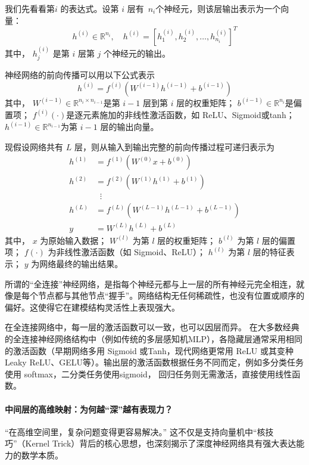 我们先看看第\( i \) 的表达式。设第 \( i \)  层有~$ n_i$个神经元，则该层输出表示为一个向量：
  \[
h^{(i)} \in \mathbb{R}^{n_i}, \quad h^{(i)} = \left[h^{(i)}_1, h^{(i)}_2, \dots, h^{(i)}_{n_i} \right]^T
\]
其中，  \( h^{(i)}_j \) 是第 \( i \) 层第 \( j \) 个神经元的输出。

神经网络的前向传播可以用以下公式表示
\[
h^{(i)} = f^{(i)}\left( W^{(i-1)} h^{(i-1)} + b^{(i-1)} \right)
\]
其中，
\( W^{(i-1)} \in \mathbb{R}^{n_i \times n_{i-1}} \)是第 \( i-1 \) 层到第 \( i \) 层的权重矩阵；
 \( b^{(i-1)} \in \mathbb{R}^{n_i} \)是偏置项；
 \( f^{(i)}(\cdot) \)是逐元素施加的非线性激活函数，如 ReLU、Sigmoid或tanh；
 \( h^{(i-1)} \in \mathbb{R}^{n_{i-1}} \)为第 \( i-1 \) 层的输出向量。
 
现假设网络共有 \( L \) 层，则从输入到输出完整的前向传播过程可递归表示为
\[
\begin{aligned}
h^{(1)} &= f^{(1)} \left(W^{(0)}x + b^{(0)}\right)\\[6pt]
h^{(2)} &= f^{(2)} \left(W^{(1)}h^{(1)} + b^{(1)}\right)\\[6pt]
&\;\;\vdots\\[6pt]
h^{(L)} &= f^{(L)} \left(W^{(L-1)}h^{(L-1)} + b^{(L-1)}\right)\\[6pt]
y &= W^{(L)}h^{(L)} + b^{(L)}
\end{aligned}
\]
其中，
 \(x\) 为原始输入数据；
\(W^{(l)}\) 为第 \(l\) 层的权重矩阵；
 \(b^{(l)}\) 为第 \(l\) 层的偏置项；
 \(f(\cdot)\) 为非线性激活函数（如 Sigmoid、ReLU）；
 \(h^{(l)}\) 为第 \(l\) 层的特征表示；
 \(y\) 为网络最终的输出结果。

所谓的“全连接”神经网络，是指每个神经元都与上一层的所有神经元完全相连，就像是每个节点都与其他节点“握手”。网络结构无任何稀疏性，也没有位置或顺序的偏好。这使得它在建模结构灵活性上表现强大。

在全连接网络中，每一层的激活函数可以一致，也可以因层而异。 
在大多数经典的全连接神经网络结构中（例如传统的多层感知机MLP），各隐藏层通常采用相同的激活函数（早期网络多用 Sigmoid 或Tanh，现代网络更常用 ReLU 或其变种Leaky ReLU、GELU等）。输出层的激活函数根据任务不同而定，例如多分类任务使用 softmax，二分类任务使用sigmoid， 回归任务则无需激活，直接使用线性函数。

\paragraph*{中间层的高维映射：为何越“深”越有表现力？}
“在高维空间里，复杂问题变得更容易解决。” 这不仅是支持向量机中“核技巧”（Kernel Trick）背后的核心思想，也深刻揭示了深度神经网络具有强大表达能力的数学本质。

